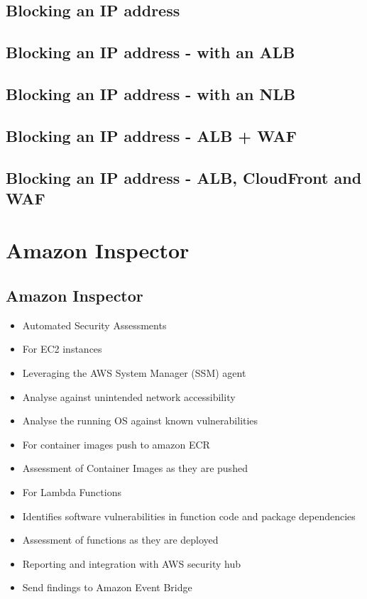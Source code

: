 \subsection{Blocking an IP address}

\subsection{Blocking an IP address - with an ALB}

\subsection{Blocking an IP address - with an NLB}

\subsection{Blocking an IP address - ALB + WAF}

\subsection{Blocking an IP address - ALB, CloudFront and WAF}


\section{Amazon Inspector}

\subsection{Amazon Inspector}
\begin{itemize}
    \item Automated Security Assessments
    \item For EC2 instances
    \item Leveraging the AWS System Manager (SSM) agent
    \item Analyse against unintended network accessibility
    \item Analyse the running OS against known vulnerabilities
    \item For container images push to amazon ECR
    \item Assessment of Container Images as they are pushed
    \item For Lambda Functions
    \item Identifies software vulnerabilities in function code and package dependencies
    \item Assessment of functions as they are deployed
    \item Reporting and integration with AWS security hub
    \item Send findings to Amazon Event Bridge
\end{itemize}

